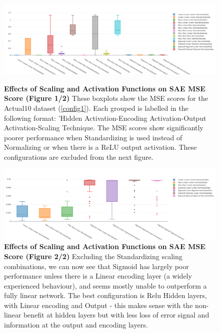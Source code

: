 \documentclass[a4paper,latin]{paper}
\begin{document}
\begin{figure}[H]
	\centering
	\begin{minipage}{0.45\textwidth}
		\centering 
		\includegraphics[scale=0.2]{images/iteration_two/linear/0Scaling_and_Activation_Combos_Min_MSE.png}
		\caption{\textbf{Effects of Scaling and Activation Functions on SAE MSE Score (Figure 1/2)}
			\newline These boxplots show the MSE scores for the Actual10 dataset (\ref{config1}). Each grouped is labelled in the following format: 'Hidden Activation-Encoding Activation-Output Activation-Scaling Technique. The MSE scores show significantly poorer performance when Standardizing is used instead of Normalizing or when there is a ReLU output activation. These configurations are excluded from the next figure.}
		\label{figure-results-scaling-and-relu}
	\end{minipage}\hfill
	\begin{minipage}{0.45\textwidth}
		\centering 
		\includegraphics[scale=0.2]{images/iteration_two/linear/1Activation_Combos-Min_MSE.png}
		\caption{\textbf{Effects of Scaling and Activation Functions on SAE MSE Score (Figure 2/2)} 
			\newline Excluding the Standardizing scaling combinations, we can now see that Sigmoid has largely poor performance unless there is a Linear encoding layer (a widely experienced behaviour), and seems mostly unable to outperform a fully linear network. The best configuration is Relu Hidden layers, with Linear encoding and Output - this makes sense with the non-linear benefit at hidden layers but with less loss of error signal and information at the output and encoding layers.}
		\label{figure-results-linear-act}
	\end{minipage}
\end{figure}
\end{document}
